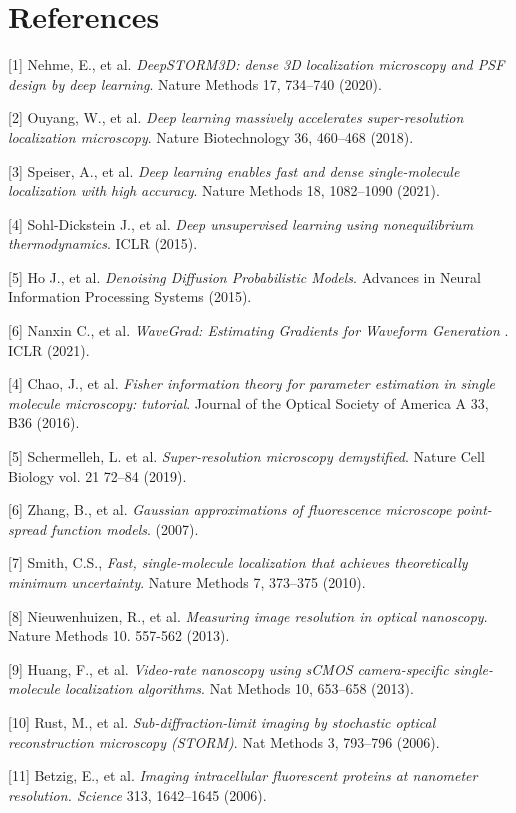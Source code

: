 \documentclass{article}
\begin{document}
\clearpage
\section*{References}


{
\small


[1] Nehme, E., et al. {\it DeepSTORM3D: dense 3D localization microscopy and PSF design by deep learning}. Nature Methods 17, 734–740 (2020).


[2] Ouyang, W., et al. {\it Deep learning massively accelerates super-resolution localization microscopy}. Nature Biotechnology 36, 460–468 (2018).


[3] Speiser, A., et al. {\it Deep learning enables fast and dense single-molecule localization with high accuracy}. Nature Methods 18, 1082–1090 (2021).

[4] Sohl-Dickstein J., et al. {\it Deep unsupervised learning using nonequilibrium thermodynamics}. ICLR (2015).

[5] Ho J., et al. {\it Denoising Diffusion Probabilistic Models}. Advances in Neural Information Processing Systems (2015).

[6] Nanxin C., et al. {\it WaveGrad: Estimating Gradients for Waveform Generation
}. ICLR (2021).

[4] Chao, J., et al. {\it Fisher information theory for parameter estimation in single molecule microscopy: tutorial}. Journal of the Optical Society of America A 33, B36 (2016). 

[5] Schermelleh, L. et al. {\it Super-resolution microscopy demystified}. Nature Cell Biology vol. 21 72–84 (2019). 

[6] Zhang, B., et al. {\it Gaussian approximations of fluorescence microscope point-spread function models}. (2007). 

[7] Smith, C.S.,  {\it Fast, single-molecule localization that achieves theoretically minimum uncertainty}. Nature Methods 7, 373–375 (2010). 

[8] Nieuwenhuizen, R., et al. {\it Measuring image resolution in optical nanoscopy}. Nature Methods 10. 557-562 (2013). 

[9] Huang, F., et al. {\it Video-rate nanoscopy using sCMOS camera-specific single-molecule localization algorithms}. Nat Methods 10, 653–658 (2013). 

[10] Rust, M., et al. {\it Sub-diffraction-limit imaging by stochastic optical reconstruction microscopy (STORM)}. Nat Methods 3, 793–796 (2006).

[11] Betzig, E., et al. {\it Imaging intracellular fluorescent proteins at nanometer resolution. Science} 313, 1642–1645 (2006).

}
\end{document}
